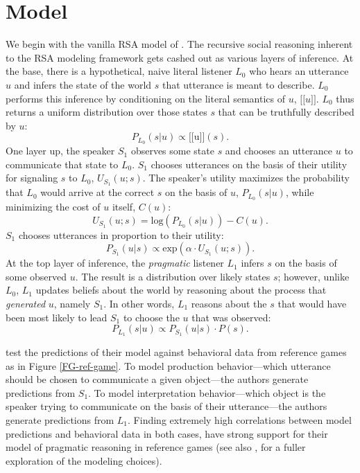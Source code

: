 \documentclass[10pt,a4paper]{article}
\newcommand{\sem}[1]{\mbox{$[\![$#1$]\!]$}}
\begin{document}
\section{Model}

We begin with the vanilla RSA model of . The recursive social reasoning inherent to the RSA modeling framework gets cashed out as various layers of inference. At the base, there is a hypothetical, naive literal listener $L_0$ who hears an utterance $u$ and infers the state of the world $s$ that utterance is meant to describe. $L_0$ performs this inference by conditioning on the literal semantics of $u$, \sem{$u$}. $L_0$ thus returns a uniform distribution over those states $s$ that can be truthfully described by $u$:
$$P_{L_{0}}(s|u) \propto \sem{u}(s).$$
One layer up, the speaker $S_1$ observes some state $s$ and chooses an utterance $u$ to communicate that state to $L_0$. $S_1$ chooses utterances on the basis of their utility for signaling $s$ to $L_0$, $U_{S_1}(u;s)$. The speaker's utility maximizes the probability that $L_0$ would arrive at the correct $s$ on the basis of $u$, $P_{L_{0}}(s|u)$, while minimizing the cost of $u$ itself, $C(u)$:
$$U_{S_{1}}(u;s) = \textrm{log}(P_{L_{0}}(s|u)) - C(u).$$
$S_1$ chooses utterances in proportion to their utility:
$$P_{S_{1}} (u|s) \propto   \textrm{exp}(\alpha \cdot U_{S_{1}} (u;s)).$$
At the top layer of inference, the \emph{pragmatic} listener $L_1$ infers $s$ on the basis of some observed $u$. The result is a distribution over likely states $s$; however, unlike $L_0$, $L_1$ updates beliefs about the world by reasoning about the process that \emph{generated} $u$, namely $S_1$. In other words, $L_1$ reasons about the $s$ that would have been most likely to lead $S_1$ to choose the  $u$ that was observed:
$$P_{L_{1}}(s|u) \propto P_{S_{1}}(u|s) \cdot P(s).$$

 test the predictions of their model against behavioral data from reference games as in Figure \ref{FG-ref-game}. To model production behavior---which utterance should be chosen to communicate a given object---the authors generate predictions from $S_1$. To model interpretation behavior---which object is the speaker trying to communicate on the basis of their utterance---the authors generate predictions from $L_1$. Finding extremely high correlations between model predictions and behavioral data in both cases, \citeauthor{frankgoodman2012} have strong support for their model of pragmatic reasoning in reference games (see also , for a fuller exploration of the modeling choices).
\end{document}
